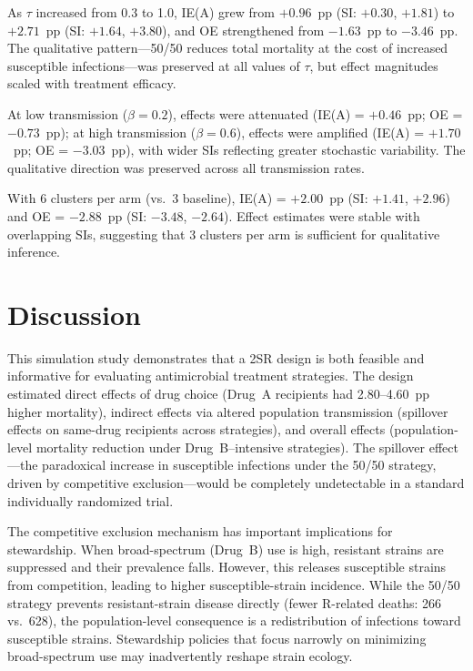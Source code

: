\documentclass[12pt]{article}
\begin{document}
As $\tau$ increased from 0.3 to 1.0, IE(A) grew from $+0.96$~pp (SI: $+0.30$, $+1.81$) to $+2.71$~pp (SI: $+1.64$, $+3.80$), and OE strengthened from $-1.63$~pp to $-3.46$~pp. The qualitative pattern---50/50 reduces total mortality at the cost of increased susceptible infections---was preserved at all values of $\tau$, but effect magnitudes scaled with treatment efficacy.

At low transmission ($\beta = 0.2$), effects were attenuated (IE(A) = $+0.46$~pp; OE = $-0.73$~pp); at high transmission ($\beta = 0.6$), effects were amplified (IE(A) = $+1.70$~pp; OE = $-3.03$~pp), with wider SIs reflecting greater stochastic variability. The qualitative direction was preserved across all transmission rates.

With 6 clusters per arm (vs.\ 3 baseline), IE(A) = $+2.00$~pp (SI: $+1.41$, $+2.96$) and OE = $-2.88$~pp (SI: $-3.48$, $-2.64$). Effect estimates were stable with overlapping SIs, suggesting that 3 clusters per arm is sufficient for qualitative inference.

\section*{Discussion}

This simulation study demonstrates that a 2SR design is both feasible and informative for evaluating antimicrobial treatment strategies. The design estimated direct effects of drug choice (Drug~A recipients had 2.80--4.60~pp higher mortality), indirect effects via altered population transmission (spillover effects on same-drug recipients across strategies), and overall effects (population-level mortality reduction under Drug~B--intensive strategies). The spillover effect---the paradoxical increase in susceptible infections under the 50/50 strategy, driven by competitive exclusion---would be completely undetectable in a standard individually randomized trial.

The competitive exclusion mechanism has important implications for stewardship. When broad-spectrum (Drug~B) use is high, resistant strains are suppressed and their prevalence falls. However, this releases susceptible strains from competition, leading to higher susceptible-strain incidence. While the 50/50 strategy prevents resistant-strain disease directly (fewer R-related deaths: 266 vs.\ 628), the population-level consequence is a redistribution of infections toward susceptible strains. Stewardship policies that focus narrowly on minimizing broad-spectrum use may inadvertently reshape strain ecology.\cite{lipsitch_epidemiology_2000,olesen_role_2020}
\end{document}
